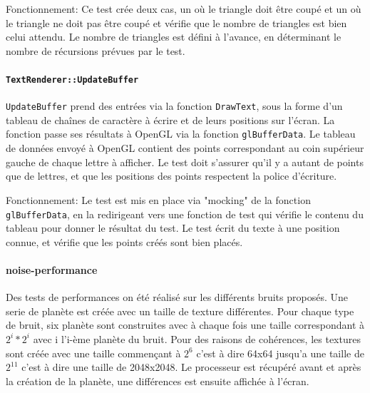 Fonctionnement: Ce test crée deux cas, un où le triangle doit être coupé
et un où le triangle ne doit pas être coupé et vérifie que le nombre de
triangles est bien celui attendu. Le nombre de triangles est défini à
l'avance, en déterminant le nombre de récursions prévues par le test.




\paragraph{\texttt{TextRenderer::UpdateBuffer}}\label{textrendererupdatebuffer}

\texttt{UpdateBuffer} prend des entrées via la fonction
\texttt{DrawText}, sous la forme d'un tableau de chaînes de caractère à
écrire et de leurs positions sur l'écran. La fonction passe ses
résultats à OpenGL via la fonction \texttt{glBufferData}. Le tableau de
données envoyé à OpenGL contient des points correspondant au coin
supérieur gauche de chaque lettre à afficher. Le test doit s'assurer
qu'il y a autant de points que de lettres, et que les positions des
points respectent la police d'écriture.

Fonctionnement: Le test est mis en place via "mocking" de la fonction
\texttt{glBufferData}, en la redirigeant vers une fonction de test qui vérifie le
contenu du tableau pour donner le résultat du test. Le test écrit du
texte à une position connue, et vérifie que les points créés sont bien
placés.



\paragraph{noise-performance}

Des tests de performances on été réalisé sur les différents bruits proposés. Une serie de planète est créée avec un taille de texture différentes. Pour chaque type de bruit, six planète sont construites avec à chaque fois une taille correspondant à $2^{i} * 2^{i}$ avec i l'i-ème planète du bruit. Pour des raisons de cohérences, les textures sont créée avec une taille commençant à $2^{6}$ c'est à dire 64x64 jusqu'a une taille de $2^{11}$ c'est à dire une taille de 2048x2048. Le processeur est récupéré avant et après la création de la planète, une différences est ensuite affichée à l'écran.\\

